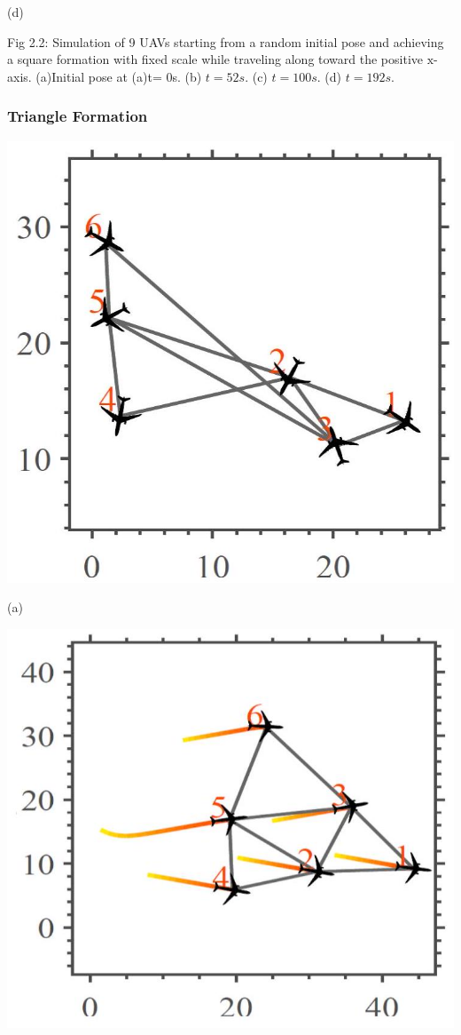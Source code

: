 \documentclass[10pt]{article}
\begin{document}
(d)

Fig 2.2: Simulation of 9 UAVs starting from a random initial pose and achieving a square formation with fixed scale while traveling along toward the positive $\mathrm{x}$-axis. (a)Initial pose at (a)t= 0s. (b) $t=52 s$. (c) $t=100 s$. (d) $t=192 s$.

\subsubsection{Triangle Formation}
\begin{center}
\includegraphics[max width=\textwidth]{2023_10_07_53b70c7408bc8e139415g-38(2)}
\end{center}

(a)

\begin{center}
\includegraphics[max width=\textwidth]{2023_10_07_53b70c7408bc8e139415g-38(1)}
\end{center}
\end{document}
